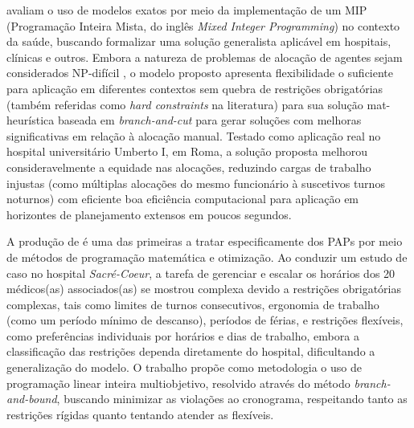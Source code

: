  avaliam o uso de modelos exatos por meio da implementação de um MIP (Programação Inteira Mista, do inglês \textit{Mixed Integer Programming}) no contexto da saúde, buscando formalizar uma solução generalista aplicável em hospitais, clínicas e outros. Embora a natureza de problemas de alocação de agentes sejam considerados NP-difícil \cite{Even_Itai_Shamir_1976}, o modelo proposto apresenta flexibilidade o suficiente para aplicação em diferentes contextos sem quebra de restrições obrigatórias (também referidas como \textit{hard constraints} na literatura) para sua solução mat-heurística baseada em \textit{branch-and-cut} para gerar soluções com melhoras significativas em relação à alocação manual. Testado como aplicação real no hospital universitário Umberto I, em Roma, a solução proposta melhorou consideravelmente a equidade nas alocações, reduzindo cargas de trabalho injustas (como múltiplas alocações do mesmo funcionário à suscetivos turnos noturnos) com eficiente boa eficiência computacional para aplicação em horizontes de planejamento extensos em poucos segundos.

A produção de  é uma das primeiras a tratar especificamente dos PAPs por meio de métodos de programação matemática e otimização. Ao conduzir um estudo de caso no hospital \textit{Sacré-Coeur}, a tarefa de gerenciar e escalar os horários dos 20 médicos(as) associados(as) se mostrou complexa devido a restrições obrigatórias complexas, tais como limites de turnos consecutivos, ergonomia de trabalho (como um período mínimo de descanso), períodos de férias, e restrições flexíveis, como preferências individuais por horários e dias de trabalho, embora a classificação das restrições dependa diretamente do hospital, dificultando a generalização do modelo. O trabalho propõe como metodologia o uso de programação linear inteira  multiobjetivo, resolvido através do método \textit{branch-and-bound}, buscando minimizar as violações ao cronograma, respeitando tanto as restrições rígidas quanto tentando atender as flexíveis.

